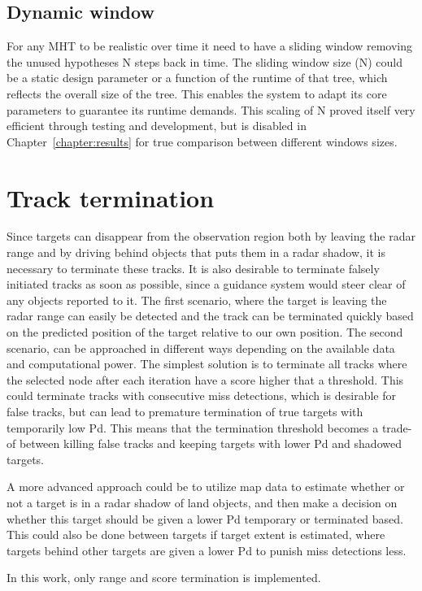 \subsection{Dynamic window}
For any MHT to be realistic over time it need to have a sliding window removing the unused hypotheses N steps back in time. The sliding window size (N) could be a static design parameter or a function of the runtime of that tree, which reflects the overall size of the tree. This enables the system to adapt its core parameters to guarantee its runtime demands. This scaling of N proved itself very efficient through testing and development, but is disabled in Chapter~\ref{chapter:results} for true comparison between different windows sizes.

\section{Track termination}
Since targets can disappear from the observation region both by leaving the radar range and by driving behind objects that puts them in a radar shadow, it is necessary to terminate these tracks. It is also desirable to terminate falsely initiated tracks as soon as possible, since a guidance system would steer clear of any objects reported to it. The first scenario, where the target is leaving the radar range can easily be detected and the track can be terminated quickly based on the predicted position of the target relative to our own position. The second scenario, can be approached in different ways depending on the available data and computational power. The simplest solution is to terminate all tracks where the selected node after each iteration have a score higher that a threshold. This could terminate tracks with consecutive miss detections, which is desirable for false tracks, but can lead to premature termination of true targets with temporarily low \gls{Pd}. This means that the termination threshold becomes a trade-of between killing false tracks and keeping targets with lower \gls{Pd} and shadowed targets. 

A more advanced approach could be to utilize map data to estimate whether or not a target is in a radar shadow of land objects, and then make a decision on whether this target should be given a lower \gls{Pd} temporary or terminated based. This could also be done between targets if target extent is estimated, where targets behind other targets are given a lower \gls{Pd} to punish miss detections less.

In this work, only range and score termination is implemented.

